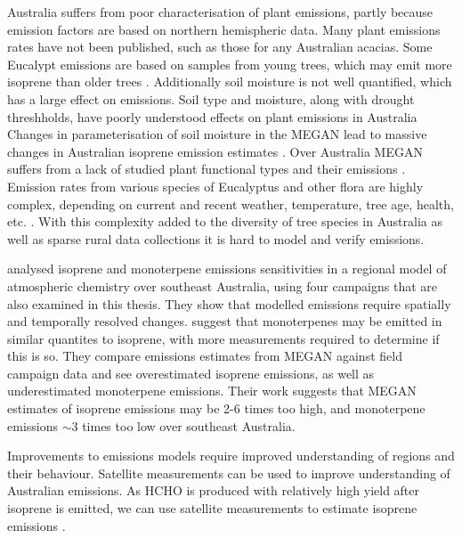     
    Australia suffers from poor characterisation of plant emissions, partly because emission factors are based on northern hemispheric data.
    Many plant emissions rates have not been published, such as those for any Australian acacias.
    Some Eucalypt emissions are based on samples from young trees, which may emit more isoprene than older trees \parencite{Emmerson2016}.
    Additionally soil moisture is not well quantified, which has a large effect on emissions.
    Soil type and moisture, along with drought threshholds, have poorly understood effects on plant emissions in Australia
    Changes in parameterisation of soil moisture in the MEGAN lead to massive changes in Australian isoprene emission estimates \parencite{Sindelarova2014}.
    Over Australia MEGAN suffers from a lack of studied plant functional types and their emissions \parencite[eg.][]{Muller2008}.
    Emission rates from various species of Eucalyptus and other flora are highly complex, depending on current and recent weather, temperature, tree age, health, etc. \parencite{Guenther2012}. 
    With this complexity added to the diversity of tree species in Australia as well as sparse rural data collections it is hard to model and verify emissions.
       
    \textcite{Emmerson2016} %
    analysed isoprene and monoterpene emissions sensitivities in a regional model of atmospheric chemistry over southeast Australia, using four campaigns that are also examined in this thesis.
    They show that modelled emissions require spatially and temporally resolved changes.
    \textcite{Emmerson2016} suggest that monoterpenes may be emitted in similar quantites to isoprene, with more measurements required to determine if this is so.
    They compare emissions estimates from MEGAN against field campaign data and see overestimated isoprene emissions, as well as underestimated monoterpene emissions.
    Their work suggests that MEGAN estimates of isoprene emissions may be 2-6 times too high, and monoterpene emissions $\sim3$ times too low over southeast Australia.
    
    
    Improvements to emissions models require improved understanding of regions and their behaviour.
    Satellite measurements can be used to improve understanding of Australian emissions.
    As HCHO is produced with relatively high yield after isoprene is emitted, we can use satellite measurements to estimate isoprene emissions \parencite[e.g.]{Palmer2001, Millet2006, Bauwens2016}.
    
